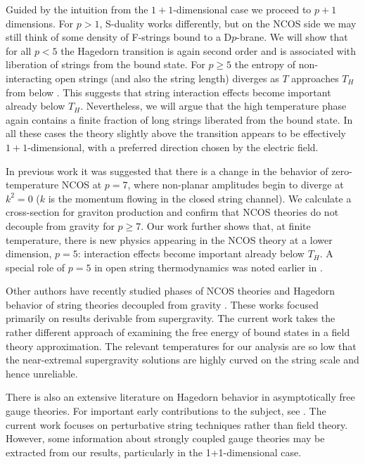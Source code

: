 Guided by the intuition from the $1+1$-dimensional case we proceed to
$p+1$ dimensions. For $p>1$, S-duality works differently, but
on the NCOS side we may still think of some density of F-strings
bound to a D$p$-brane. We will show that for all $p<5$
the Hagedorn transition is again second order
and is associated with liberation of
strings from the bound state.  For
$p \geq 5$ the entropy of non-interacting open strings
(and also the string length) diverges as $T$
approaches $T_H$ from below \cite{Eli}. 
This suggests that string interaction effects
become important already below $T_H$. Nevertheless, we will
argue that the high temperature phase again contains a finite
fraction of long strings liberated from the bound state.
In all these cases the theory slightly
above the transition appears to be effectively $1+1$-dimensional, with
a preferred direction chosen by the electric field.

In previous work \cite{GMMS} it was suggested that there is a change
in the behavior of zero-temperature
NCOS at $p=7$, where non-planar amplitudes begin to diverge at
$k^2 =0$ ($k$ is the momentum flowing in the closed string channel). 
We calculate a cross-section
for graviton production and confirm that NCOS theories do not
decouple from gravity for $p\geq 7$.
Our work further shows that, at finite temperature, 
there is new physics appearing in the NCOS theory at
a lower dimension, $p=5$: interaction effects
become important already below $T_H$. A special role of $p=5$ in open string
thermodynamics was noted earlier in \cite{Eli}.


Other authors have recently studied phases of NCOS theories and
Hagedorn behavior of string theories decoupled from gravity
\cite{HarmarkZero,HarmarkOne,HarmarkTwo,Sahakian}.  These works
focused primarily on results derivable from supergravity.  The current
work takes the rather different approach of examining the free energy
of bound states in a field theory approximation.  The relevant
temperatures for our analysis are so low that the near-extremal
supergravity solutions are highly curved on the string scale and hence
unreliable.

There is also an extensive literature on Hagedorn behavior in
asymptotically free gauge theories.  For important early contributions
to the subject, see \cite{PolQCD,Susskind,thorn}.  The current work
focuses on perturbative string techniques rather than field theory.
However, some information about strongly coupled gauge theories may be
extracted from our results, particularly in the 1+1-dimensional case.




